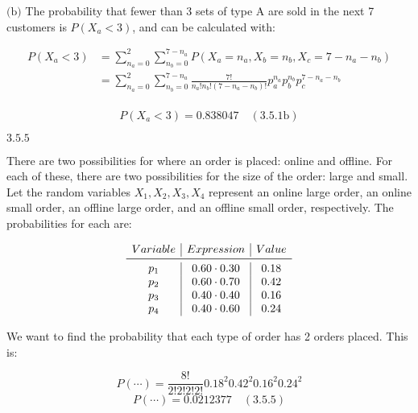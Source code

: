 \documentclass{article}
\newcommand{\problem}[2]{$\boxed{\text{#1.#2}}$}
\newcommand{\subproblem}[3]{$\boxed{\text{(#3)}}$}
\newcommand{\solution}[3]{\boxed{#3\quad(\text{#1.#2})}}
\newcommand{\subsolution}[4]{\boxed{#4\quad(\text{#1.#2#3})}}
\newcommand{\multistep}[1]{\begin{array}{rl} #1 \end{array}}
\begin{document}
%
\subproblem{3.5}{1}{b} The probability that fewer than 3 sets of type
A are sold in the next 7 customers is $P(X_a<3)$, and can be
calculated with:

\[
\multistep{
P(X_a<3)&=\sum\limits_{n_a=0}^2 \sum\limits_{n_b=0}^{7-n_a} P(X_a=n_a,X_b=n_b,X_c=7-n_a-n_b) \\
&=\sum\limits_{n_a=0}^2 \sum\limits_{n_b=0}^{7-n_a} \frac{7!}{n_a!n_b!(7-n_a-n_b)!} p_a^{n_a} p_b^{n_b} p_c^{7-n_a-n_b} \\
}
\]

\[
\subsolution{3.5}{1}{b}{P(X_a<3)=0.838047}
\]

%
\problem{3.5}{5}

There are two possibilities for where an order is placed: online and
offline. For each of these, there are two possibilities for the size
of the order: large and small. Let the random variables
$X_1,X_2,X_3,X_4$ represent an online large order, an online small
order, an offline large order, and an offline small order,
respectively. The probabilities for each are:

\[
\begin{array}{c|c|c}
Variable & Expression & Value \\
\midrule
p_1 & 0.60\cdot0.30 & 0.18 \\
p_2 & 0.60\cdot0.70 & 0.42 \\
p_3 & 0.40\cdot0.40 & 0.16 \\
p_4 & 0.40\cdot0.60 & 0.24 \\
\end{array}
\]

We want to find the probability that each type of order has 2 orders
placed. This is:

\[
P(\cdots)=\frac{8!}{2!2!2!2!} 0.18^2 0.42^2 0.16^2 0.24^2
\] \[
\solution{3.5}{5}{P(\cdots)=0.0212377}
\]
\end{document}
